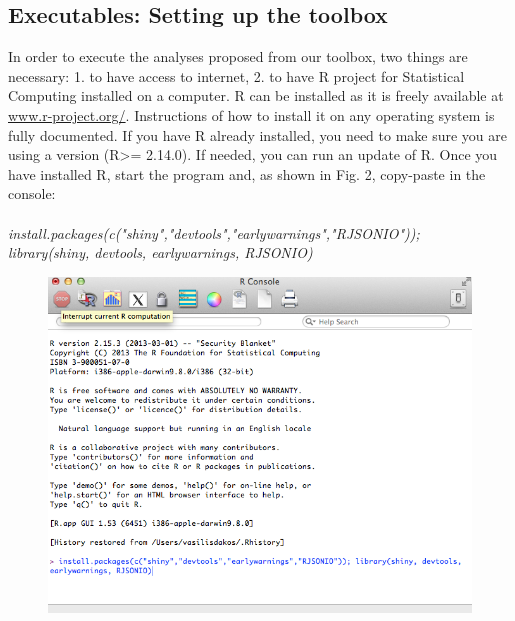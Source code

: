 \documentclass[12pt,a4paper,final]{article}
\begin{document}
\begin{doublespacing}
\section{Executables: Setting up the toolbox}
In order to execute the analyses proposed from our toolbox, two things are necessary:
1. to have access to internet,
2. to have R project for Statistical Computing installed on a computer.
R can be installed as it is freely available at \url{www.r-project.org/}. Instructions of how to install it on any operating system is fully documented. If you have R already installed, you need to make sure you are using a version (R>= 2.14.0). If needed, you can run an update of R.
Once you have installed R, start the program and, as shown in Fig. 2, copy-paste in the console:\\
\\
\textit{install.packages(c("shiny","devtools","earlywarnings","RJSONIO"));\\
library(shiny, devtools, earlywarnings, RJSONIO)}\\
\begin{figure}[ht]
\begin{center}
\includegraphics[scale=0.55]{R_install_ews4.png}

\end{center}
\end{figure}
\end{doublespacing}
\end{document}
